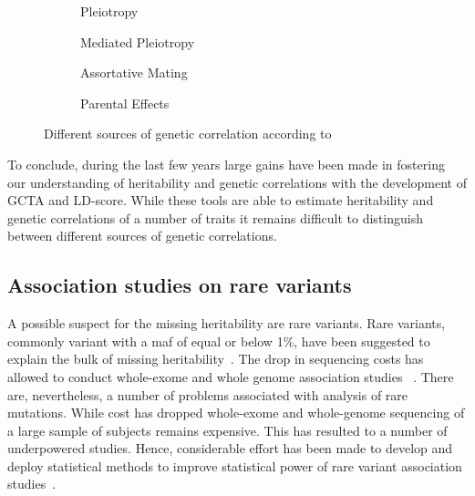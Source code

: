 \begin{figure}[htp]
  \begin{subfigure}[t]{0.5\textwidth}
    \centering
    \resizebox{0.5\linewidth}{!}{} 
    \caption{Pleiotropy}\label{fig:pleiotropy}
  \end{subfigure}
  \begin{subfigure}[t]{0.5\textwidth}
    \centering
    \resizebox{0.5\linewidth}{!}{} 
    \caption{Mediated Pleiotropy}\label{fig:mediated_pleiotropy}
  \end{subfigure}
  \begin{subfigure}[t]{0.5\textwidth}
    \centering
    \resizebox{0.6\linewidth}{!}{} 
    \caption{Assortative Mating}\label{fig:assortative_mating}
  \end{subfigure}
  \begin{subfigure}[t]{0.5\textwidth}
    \centering
    \resizebox{0.6\linewidth}{!}{}
    \caption{Parental Effects}\label{fig:parental_effects}
  \end{subfigure}
  \caption{Different sources of genetic correlation according to~\citet{Pickrell2016}}\label{fig:genetic_correlation}
\end{figure}

To conclude, during the last few years large gains have been made in fostering our understanding of heritability and genetic correlations with the development of GCTA and LD-score.
While these tools are able to estimate heritability and genetic correlations of a number of traits it remains difficult to distinguish between different sources of genetic correlations.

\subsection{Association studies on rare variants}
\label{sub:association_studies_on_rare_varitants}

A possible suspect for the missing heritability are rare variants.
Rare variants, commonly variant with a \acrfull{maf} of equal or below 1\%, have been suggested to explain the bulk of missing heritability~\cite{Jiang2013,Li2009a}.
The drop in sequencing costs has allowed to conduct whole-exome and whole genome association studies ~\cite{Goodwin2016}.
There are, nevertheless, a number of problems associated with analysis of rare mutations.
While cost has dropped whole-exome and whole-genome sequencing of a large sample of subjects remains expensive.
This has resulted to a number of underpowered studies.
Hence, considerable effort has been made to develop and deploy statistical methods to improve statistical power of rare variant association studies~\cite{Morris2010,Zeng2014,Daye2012,Manuscript2013}.

